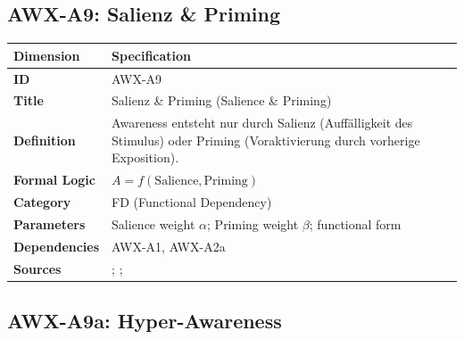 
\subsection{AWX-A9: Salienz \& Priming}

\begin{table}[htbp]
\small
\begin{tabular}{p{3cm}p{11cm}}
\toprule
\textbf{Dimension} & \textbf{Specification} \\
\midrule
\textbf{ID} & AWX-A9 \\
\textbf{Title} & Salienz \& Priming (Salience \& Priming) \\
\textbf{Definition} & Awareness entsteht nur durch Salienz (Auffälligkeit des Stimulus) oder Priming (Voraktivierung durch vorherige Exposition). \\
\textbf{Formal Logic} & $A = f(\text{Salience}, \text{Priming})$ \\
\textbf{Category} & FD (Functional Dependency) \\
\textbf{Parameters} & Salience weight $\alpha$; Priming weight $\beta$; functional form \\
\textbf{Dependencies} & AWX-A1, AWX-A2a \\
\textbf{Sources} & \citet{PAP-bordalo2012salience}; \citet{bordalo2013salience}; \citet{bargh1996automaticity} \\
\bottomrule
\end{tabular}
\end{table}


\subsection{AWX-A9a: Hyper-Awareness}

